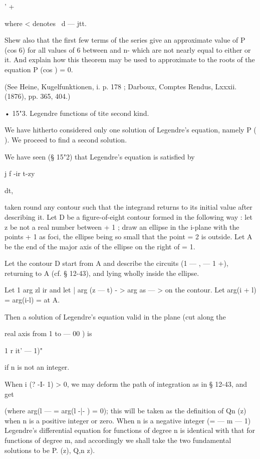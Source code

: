 {{' +   

where <  denotes \ d — jtt. 

Shew also that the first few terms of the series give an approximate value of P  (cos 6) 
for all values of 6 between and n- which are not nearly equal to either or it. And explain 
how this theorem may be used to approximate to the roots of the equation P  (cos  ) = 0. 

(See Heine, Kugelfunktionen, i. p. 178 ; Darboux, Comptes Rendus, Lxxxii. (1876), 
pp. 365, 404.) 

•  15"3. Legendre functions of tite second kind. 

We have hitherto considered only one solution of Legendre's equation, 
namely P ( ). We proceed to find a second solution. 

We have seen (§ 15"2) that Legendre's equation is satisfied by 



j f -ir t-zy 



dt, 



taken round any contour such that the integrand returns to its initial value 
after describing it. Let D be a figure-of-eight contour formed in the following 
way : let z be not a real number between + 1 ; draw an ellipse in the i-plane 
with the points + 1 as foci, the ellipse being so small that the point   = 2  is 
outside. Let A be the end of the major axis of the ellipse on the right 
of   = 1. 

Let the contour D start from A and describe the circuits (1 — , — 1 +), 
returning to A (cf. § 12-43), and lying wholly inside the ellipse. 

Let 1 arg zl ir and let | arg (z — t) - > arg   as   — > on the contour. Let 
arg(i + l) = arg(i-l) = at A. 

Then a solution of Legendre's equation valid in the plane (cut along the 

real axis from 1 to — 00 ) is 

1 r it' — 1)" 

if n is not an integer. 

When i  (?  -I- 1) > 0, we may deform the path of integration as in § 12-43, 
and get 

(where arg(l — = arg(l -|- ) = 0); this will be taken as the definition of 
Qn (z) when n is a positive integer or zero. When n is a negative integer 
(= — m — 1) Legendre's differential equation for functions of degree n is 
identical with that for functions of degree m, and accordingly we shall take 
the two fundamental solutions to be P.   (z), Q,n  z). 

}}
